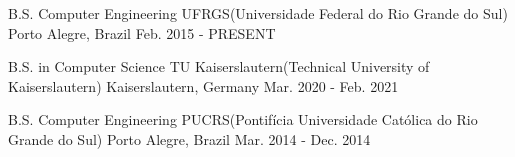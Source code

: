 
\begin{cventries}
    \cvcompactentry
    {B.S. Computer Engineering} %
    {UFRGS(Universidade Federal do Rio Grande do Sul)} %
    {Porto Alegre, Brazil} %
    {Feb. 2015 - PRESENT} %

    \cvcompactentry
    {B.S. in Computer Science} %
    {TU Kaiserslautern(Technical University of Kaiserslautern)} %
    {Kaiserslautern, Germany} %
    {Mar. 2020 - Feb. 2021} %

    \cvcompactentry
    {B.S. Computer Engineering} %
    {PUCRS(Pontifícia Universidade Católica do Rio Grande do Sul)} %
    {Porto Alegre, Brazil} %
    {Mar. 2014 - Dec. 2014} %
\end{cventries}
